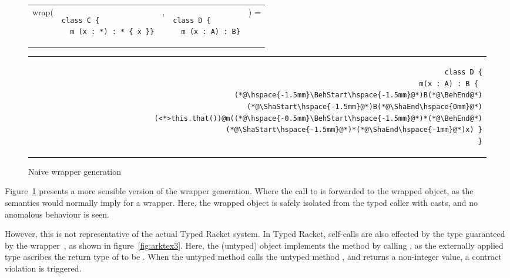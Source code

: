 \documentclass[a4paper,USenglish]{tex/lipics-v2016}
\begin{document}
\begin{figure}[!ht]
\begin{tabular}{ER{4.5cm}ER{3.5cm}E}
wrap( & 
\begin{lstlisting}
class C { 
  m (x : *) : * { x }}
\end{lstlisting}& , &
\begin{lstlisting}
class D { 
  m (x : A) : B}
\end{lstlisting}&) =
\end{tabular}
\begin{tabular}{@{}l@{}r@{}}
\hspace{4cm} \,&
\begin{minipage}{\textwidth-4cm}
\begin{lstlisting}
class D {
  m(x : A) : B { 
    (*@\hspace{-1.5mm}\BehStart\hspace{-1.5mm}@*)B(*@\BehEnd@*)(*@\ShaStart\hspace{-1.5mm}@*)B(*@\ShaEnd\hspace{0mm}@*)(<*>this.that())@m((*@\hspace{-0.5mm}\BehStart\hspace{-1.5mm}@*)*(*@\BehEnd@*)(*@\ShaStart\hspace{-1.5mm}@*)*(*@\ShaEnd\hspace{-1mm}@*)x) }
}
\end{lstlisting}
\end{minipage}
\end{tabular}
\caption{Naive wrapper generation}
\label{fig:rktex2}
\end{figure}

Figure~\ref{fig:rktex2} presents a more sensible version of the wrapper generation. 
Where the call to \m is forwarded to the wrapped object, as the semantics would 
normally imply for a wrapper. Here, the wrapped object is safely isolated from the typed caller 
with casts, and no anomalous behaviour is seen.

However, this is not representative of the actual Typed Racket system. In Typed
Racket, self-calls are also effected by the type guaranteed by the
wrapper~\cite{Takikawa:2012}, as shown in figure~\ref{fig:arktex3}. Here, the
(untyped)  object implements the  method by calling , 
as the externally applied type  ascribes the return type of 
to be . When the untyped method  calls the untyped method
, and returns a non-integer value, a contract violation is triggered.
\end{document}
